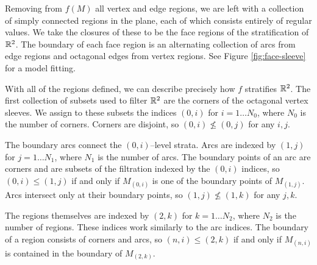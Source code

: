 Removing from $f(M)$ all vertex and edge regions, we are left with a collection of simply connected regions in the plane, each of which consists entirely of regular values.
We take the closures of these to be the face regions of the stratification of $\mathbb{R}^2$.
The boundary of each face region is an alternating collection of arcs from edge regions and octagonal edges from vertex regions.
See Figure \ref{fig:face-sleeve} for a model fitting.

With all of the regions defined, we can describe precisely how $f$ stratifies $\mathbb{R}^2$.
The first collection of subsets used to filter $\mathbb{R}^2$ are the corners of the octagonal vertex sleeves.
We assign to these subsets the indices $(0,i)$ for $i=1\dots N_0$, where $N_0$ is the number of corners.
Corners are disjoint, so $(0,i)\nleq (0,j)$ for any $i,j$.

The boundary arcs connect the $(0,i)$--level strata.
Arcs are indexed by $(1,j)$ for $j=1\dots N_1$, where $N_1$ is the number of arcs.
The boundary points of an arc are corners and are subsets of the filtration indexed by the $(0,i)$ indices, so $(0,i)\leq (1,j)$ if and only if $M_{(0,i)}$ is one of the boundary points of $M_{(1,j)}$.
Arcs intersect only at their boundary points, so $(1,j)\nleq(1,k)$ for any $j,k$. 

The regions themselves are indexed by $(2,k)$ for $k=1\dots N_2$, where $N_2$ is the number of regions.
These indices work similarly to the arc indices.
The boundary of a region consists of corners and arcs, so $(n,i)\leq(2,k)$ if and only if $M_{(n,i)}$ is contained in the boundary of $M_{(2,k)}$.
%
%
%
%

